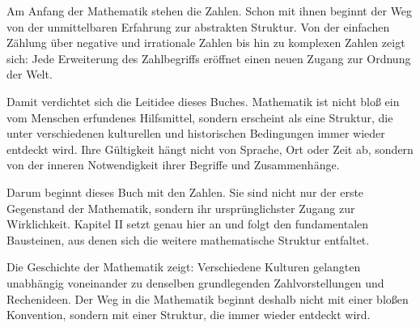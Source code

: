 Am Anfang der Mathematik stehen die Zahlen.
Schon mit ihnen beginnt der Weg von der unmittelbaren Erfahrung
zur abstrakten Struktur.
Von der einfachen Zählung über negative und irrationale Zahlen
bis hin zu komplexen Zahlen zeigt sich:
Jede Erweiterung des Zahlbegriffs eröffnet einen neuen Zugang zur Ordnung der Welt.

Damit verdichtet sich die Leitidee dieses Buches.
Mathematik ist nicht bloß ein vom Menschen erfundenes Hilfsmittel,
sondern erscheint als eine Struktur,
die unter verschiedenen kulturellen und historischen Bedingungen immer wieder entdeckt wird.
Ihre Gültigkeit hängt nicht von Sprache,
Ort oder Zeit ab,
sondern von der inneren Notwendigkeit ihrer Begriffe und Zusammenhänge.

Darum beginnt dieses Buch mit den Zahlen.
Sie sind nicht nur der erste Gegenstand der Mathematik,
sondern ihr ursprünglichster Zugang zur Wirklichkeit.
Kapitel II setzt genau hier an
und folgt den fundamentalen Bausteinen,
aus denen sich die weitere mathematische Struktur entfaltet.

\begin{NoteBox}
	\label{box:universale}
	\small
	Die Geschichte der Mathematik zeigt:
	Verschiedene Kulturen gelangten unabhängig voneinander
	zu denselben grundlegenden Zahlvorstellungen und Rechenideen.
	Der Weg in die Mathematik beginnt deshalb nicht mit einer bloßen Konvention,
	sondern mit einer Struktur, die immer wieder entdeckt wird.
\end{NoteBox}